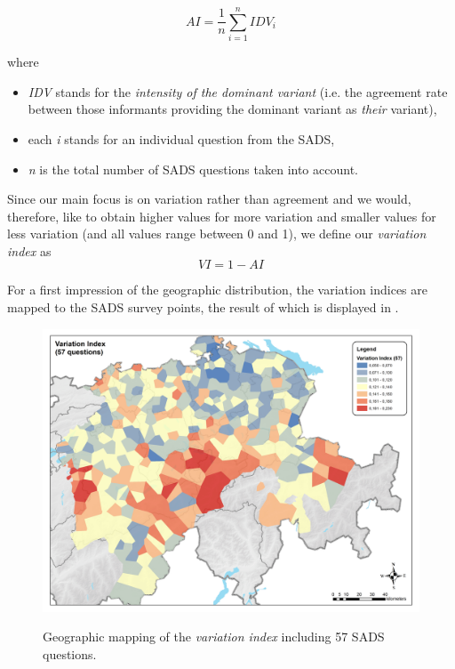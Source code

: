 \documentclass[output=paper]{LSP/langsci}
\begin{document}
\begin{equation}
\mathit{AI}=\frac{1}{n}\sum _{i=1}^{n}{{\mathit{IDV}}_{i}}
\end{equation}

where

\begin{itemize}
\item \emph{IDV} stands for the \emph{intensity of the dominant variant} (i.e. the agreement rate between those informants providing the dominant variant as \emph{their} variant),

\item each \emph{i} stands for an individual question from the SADS,

\item \emph{n} is the total number of SADS questions taken into account.

\end{itemize}

Since our main focus is on variation rather than agreement and we would, therefore, like to obtain higher values for more variation and smaller values for less variation (and all values range between 0 and 1), we define our \emph{variation index} as\\
\begin{equation}
\mathit{VI}=1-\mathit{AI}
\end{equation}

For a first impression of the geographic distribution, the variation indices are mapped to the SADS survey points, the result of which is displayed in .

\begin{figure}
\includegraphics[width=\textwidth]{illustrations/stoeck_fig5}
\label{fig:5}
\caption{Geographic mapping of the \emph{variation index} including 57 SADS questions.}
\end{figure}
\end{document}
